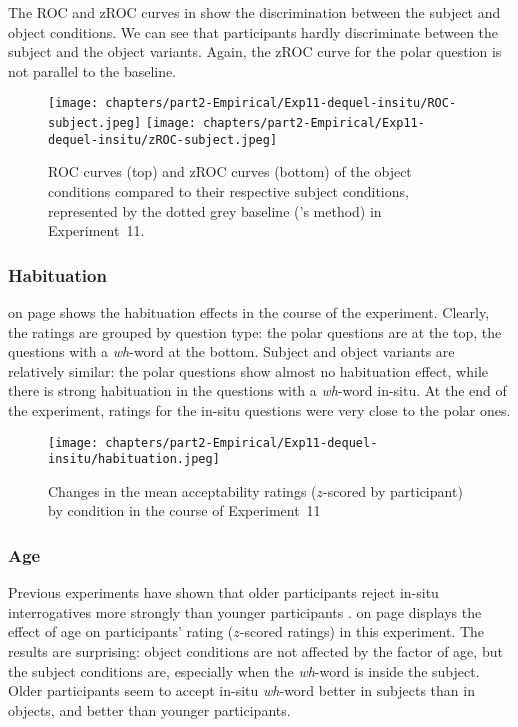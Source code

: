 The ROC and zROC curves in  show the discrimination between the subject and object conditions. We can see that participants hardly discriminate between the subject and the object variants. Again, the zROC curve for the polar question is not parallel to the baseline.

\begin{figure}
    \centering
    \texttt{[image: chapters/part2-Empirical/Exp11-dequel-insitu/ROC-subject.jpeg]}
    \texttt{[image: chapters/part2-Empirical/Exp11-dequel-insitu/zROC-subject.jpeg]}
    \caption{ROC curves (top) and zROC curves (bottom) of the object conditions compared to their respective subject conditions, represented by the dotted grey baseline (\citealt{Dillon.2019}'s method) in Experiment~11.}
    \label{fig:exp11-ROC-subj}
\end{figure}

\subsubsection{Habituation} 

 on page \pageref{fig:exp11-habituation} shows the habituation effects in the course of the experiment. Clearly, the ratings are grouped by question type: the polar questions are at the top, the questions with a \emph{wh}-word at the bottom. Subject and object variants are relatively similar: the polar questions show almost no habituation effect, while there is strong habituation in the questions with a \emph{wh}-word in-situ. At the end of the experiment, ratings for the in-situ questions were very close to the polar ones. 

\begin{figure}
    \centering
    \texttt{[image: chapters/part2-Empirical/Exp11-dequel-insitu/habituation.jpeg]}
    \caption{Changes in the mean acceptability ratings ($z$-scored by participant) by condition in the course of Experiment~11}
    \label{fig:exp11-habituation}
\end{figure}

\pagebreak
\subsubsection{Age} 

Previous experiments have shown that older participants reject in-situ interrogatives more strongly than younger participants \citep[72]{Thiberge.2018}.  on page \pageref{fig:exp11-age} displays the effect of age on participants' rating ($z$-scored ratings) in this experiment. The results are surprising: object conditions are not affected by the factor of age, but the subject conditions are, especially when the \emph{wh}-word is inside the subject. Older participants seem to accept in-situ \emph{wh}-word better in subjects than in objects, and better than younger participants. 

